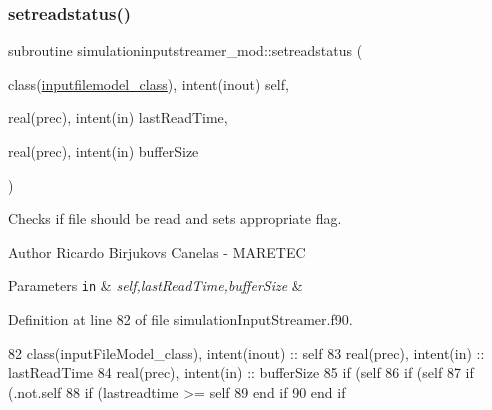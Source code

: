 \subsubsection{\texorpdfstring{setreadstatus()}{setreadstatus()}}
{\footnotesize\ttfamily subroutine simulationinputstreamer\+\_\+mod\+::setreadstatus (\begin{DoxyParamCaption}\item[{class(\mbox{\hyperlink{structsimulationinputstreamer__mod_1_1inputfilemodel__class}{inputfilemodel\+\_\+class}}), intent(inout)}]{self,  }\item[{real(prec), intent(in)}]{last\+Read\+Time,  }\item[{real(prec), intent(in)}]{buffer\+Size }\end{DoxyParamCaption})\hspace{0.3cm}{\ttfamily [private]}}



Checks if file should be read and sets appropriate flag. 

\begin{DoxyAuthor}{Author}
Ricardo Birjukovs Canelas -\/ M\+A\+R\+E\+T\+EC 
\end{DoxyAuthor}

\begin{DoxyParams}[1]{Parameters}
\mbox{\tt in}  & {\em self,last\+Read\+Time,buffer\+Size} & \\
\hline
\end{DoxyParams}


Definition at line 82 of file simulation\+Input\+Streamer.\+f90.


\begin{DoxyCode}
82     \textcolor{keywordtype}{class}(inputFileModel\_class), \textcolor{keywordtype}{intent(inout)} :: self
83     \textcolor{keywordtype}{real(prec)}, \textcolor{keywordtype}{intent(in)} :: lastReadTime
84     \textcolor{keywordtype}{real(prec)}, \textcolor{keywordtype}{intent(in)} :: bufferSize
85     \textcolor{keywordflow}{if} (self%
86         \textcolor{keywordflow}{if} (self%
87             \textcolor{keywordflow}{if} (.not.self%
88             \textcolor{keywordflow}{if} (lastreadtime >= self%
89 \textcolor{keywordflow}{        end if}
90 \textcolor{keywordflow}{    end if}
\end{DoxyCode}
